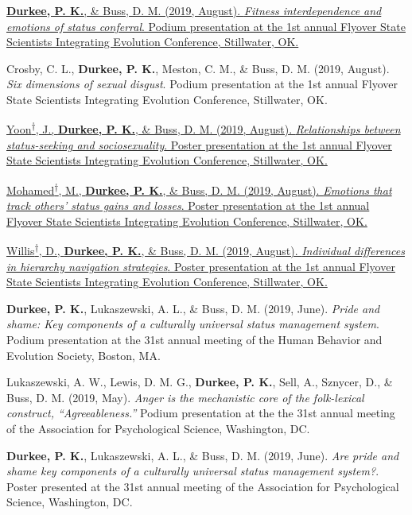 \documentclass[10.5pt,]{article}
\begin{document}
\hangindent=0.5in \href{https://osf.io/6enb8/}{\textbf{Durkee, P. K.},
\& Buss, D. M. (2019, August). \emph{Fitness interdependence and
emotions of status conferral}. Podium presentation at the 1st annual
Flyover State Scientists Integrating Evolution Conference, Stillwater,
OK.}

\hangindent=0.5in Crosby, C. L., \textbf{Durkee, P. K.}, Meston, C. M.,
\& Buss, D. M. (2019, August). \emph{Six dimensions of sexual disgust}.
Podium presentation at the 1st annual Flyover State Scientists
Integrating Evolution Conference, Stillwater, OK.

\hangindent=0.5in \href{https://osf.io/uzpj5/}{Yoon\textsuperscript{†},
J., \textbf{Durkee, P. K.}, \& Buss, D. M. (2019, August).
\emph{Relationships between status-seeking and sociosexuality}. Poster
presentation at the 1st annual Flyover State Scientists Integrating
Evolution Conference, Stillwater, OK.}

\hangindent=0.5in
\href{https://osf.io/6jnz5/}{Mohamed\textsuperscript{†}, M.,
\textbf{Durkee, P. K.}, \& Buss, D. M. (2019, August). \emph{Emotions
that track others' status gains and losses}. Poster presentation at the
1st annual Flyover State Scientists Integrating Evolution Conference,
Stillwater, OK.}

\hangindent=0.5in
\href{https://osf.io/3rv7z/}{Willis\textsuperscript{†}, D.,
\textbf{Durkee, P. K.}, \& Buss, D. M. (2019, August). \emph{Individual
differences in hierarchy navigation strategies}. Poster presentation at
the 1st annual Flyover State Scientists Integrating Evolution
Conference, Stillwater, OK.}

\hangindent=0.5in \textbf{Durkee, P. K.}, Lukaszewski, A. L., \& Buss,
D. M. (2019, June). \emph{Pride and shame: Key components of a
culturally universal status management system}. Podium presentation at
the 31st annual meeting of the Human Behavior and Evolution Society,
Boston, MA.

\hangindent=0.5in Lukaszewski, A. W., Lewis, D. M. G., \textbf{Durkee,
P. K.}, Sell, A., Sznycer, D., \& Buss, D. M. (2019, May). \emph{Anger
is the mechanistic core of the folk-lexical construct,
``Agreeableness.''} Podium presentation at the the 31st annual meeting
of the Association for Psychological Science, Washington, DC.

\hangindent=0.5in \textbf{Durkee, P. K.}, Lukaszewski, A. L., \& Buss,
D. M. (2019, June). \emph{Are pride and shame key components of a
culturally universal status management system?}. Poster presented at the
31st annual meeting of the Association for Psychological Science,
Washington, DC.
\end{document}
